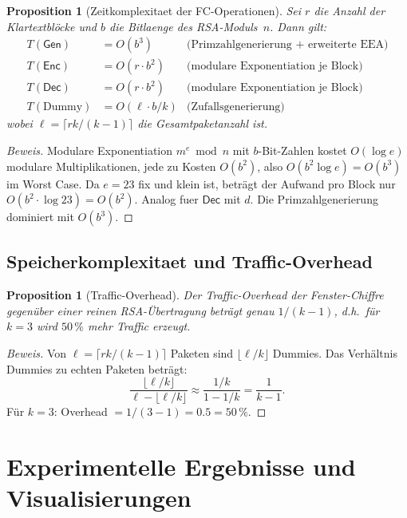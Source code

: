﻿\documentclass[12pt, a4paper]{article}
\theoremstyle{plain}
\newtheorem{proposition}[theorem]{Proposition}
\theoremstyle{definition}
\theoremstyle{remark}
\newenvironment{myproof}[1][Beweis]{%
  \begin{proof}[#1]
}{%
  \end{proof}
}
\newcommand{\Enc}{\mathsf{Enc}}
\newcommand{\Dec}{\mathsf{Dec}}
\newcommand{\Gen}{\mathsf{Gen}}
\begin{document}
\begin{proposition}[Zeitkomplexitaet der FC-Operationen]\label{prop:zeitkomp}
  Sei $r$ die Anzahl der Klartextbl\"ocke und $b$ die Bitlaenge des
  RSA-Moduls~$n$. Dann gilt:
  \begin{align*}
    T(\Gen)  &= O(b^3) & \text{(Primzahlgenerierung + erweiterte EEA)}\\
    T(\Enc)  &= O(r \cdot b^2) & \text{(modulare Exponentiation je Block)}\\
    T(\Dec)  &= O(r \cdot b^2) & \text{(modulare Exponentiation je Block)}\\
    T(\text{Dummy}) &= O(\ell \cdot b / k) & \text{(Zufallsgenerierung)}
  \end{align*}
  wobei $\ell = \lceil rk/(k-1)\rceil$ die Gesamtpaketanzahl ist.
\end{proposition}

\begin{myproof}
  Modulare Exponentiation $m^e \bmod n$ mit $b$-Bit-Zahlen kostet
  $O(\log e)$ modulare Multiplikationen, jede zu Kosten $O(b^2)$, also
  $O(b^2 \log e) = O(b^3)$ im Worst Case. Da $e=23$ fix und klein ist,
  betr\"agt der Aufwand pro Block nur $O(b^2 \cdot \log 23) = O(b^2)$.
  Analog fuer $\Dec$ mit $d$. Die Primzahlgenerierung dominiert mit $O(b^3)$. 
\end{myproof}

\subsection{Speicherkomplexitaet und Traffic-Overhead}

\begin{proposition}[Traffic-Overhead]\label{prop:overhead}
  Der Traffic-Overhead der Fenster-Chiffre gegen\"uber einer reinen
  RSA-\"Ubertragung betr\"agt genau $1/(k-1)$, d.h.\
  f\"ur $k=3$ wird $50\,\%$ mehr Traffic erzeugt.
\end{proposition}

\begin{myproof}
  Von $\ell = \lceil rk/(k-1)\rceil$ Paketen sind $\lfloor\ell/k\rfloor$
  Dummies. Das Verh\"altnis Dummies zu echten Paketen betr\"agt:
  \[
    \frac{\lfloor\ell/k\rfloor}{\ell - \lfloor\ell/k\rfloor}
    \approx \frac{1/k}{1-1/k} = \frac{1}{k-1}.
  \]
  F\"ur $k=3$: Overhead $= 1/(3-1) = 0.5 = 50\,\%$. 
\end{myproof}

\section{Experimentelle Ergebnisse und Visualisierungen}
\label{sec:plots}
\end{document}
